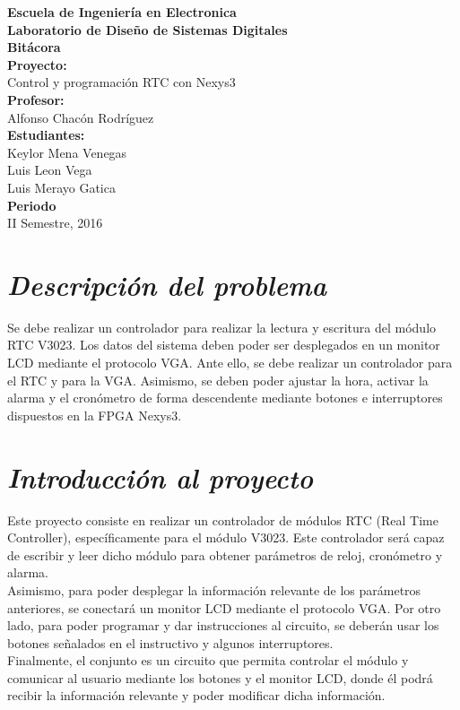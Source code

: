 \documentclass[12pt,a4paper]{report}
\begin{document}
\begin{titlepage}
\begin{center}
\vspace*{1.5cm}
\textbf{Escuela de Ingenierí­a en Electronica}\\[0.8cm]
\textbf{Laboratorio de Diseño de Sistemas Digitales}\\[1cm]
\textbf{Bitácora}\\[2cm]
\textbf{Proyecto:}\\[0.4cm]
Control y programación RTC con Nexys3 \\[1.7cm]
\textbf{Profesor:}\\[0.4cm]
Alfonso Chacón Rodrí­guez \\[1.7cm]
\textbf{Estudiantes:}\\[0.4cm]
Keylor Mena Venegas \\[0.8cm]
Luis Leon Vega \\[0.8cm]
Luis Merayo Gatica \\[1.7cm]
\textbf{Periodo}\\[0.8cm]
II Semestre, 2016\\
\end{center}
\end{titlepage}


\section*{\textit{Descripción del problema}}

Se debe realizar un controlador para realizar la lectura y escritura del módulo RTC V3023. Los datos del sistema deben poder ser desplegados en un monitor LCD mediante el protocolo VGA. Ante ello, se debe realizar un controlador para el RTC y para la VGA. Asimismo, se deben poder ajustar la hora, activar la alarma y el cronómetro de forma descendente mediante botones e interruptores dispuestos en la FPGA Nexys3.

\section*{\textit{Introducción al proyecto}}

Este proyecto consiste en realizar un controlador de módulos RTC (Real Time Controller), específicamente para el módulo V3023. Este controlador será capaz de escribir y leer dicho módulo para obtener parámetros de reloj, cronómetro y alarma. \\
Asimismo, para poder desplegar la información relevante de los parámetros anteriores, se conectará un monitor LCD mediante el protocolo VGA. Por otro lado, para poder programar y dar instrucciones al circuito, se deberán usar los botones señalados en el instructivo y algunos interruptores. \\
Finalmente, el conjunto es un circuito que permita controlar el módulo y comunicar al usuario mediante los botones y el monitor LCD, donde él podrá recibir la información relevante y poder modificar dicha información.\\
\end{document}
